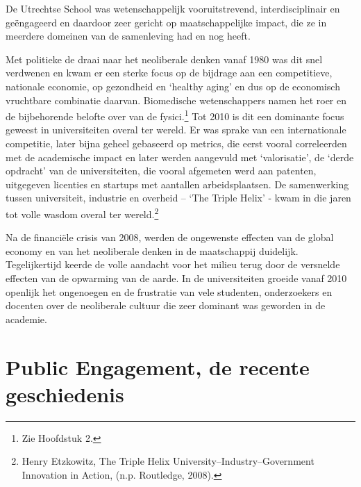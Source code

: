\documentclass[empirical, authordate, ]{new-jote-article}
\begin{document}
	 De Utrechtse School was wetenschappelijk vooruitstrevend, interdisciplinair en geëngageerd en daardoor zeer gericht op maatschappelijke impact, die ze in meerdere domeinen van de samenleving had en nog heeft.



	Met politieke de draai naar het neoliberale denken vanaf 1980 was dit snel verdwenen en kwam er een sterke focus op de bijdrage aan een competitieve, nationale economie, op gezondheid en ‘healthy aging' en dus op de economisch vruchtbare combinatie daarvan. Biomedische wetenschappers namen het roer en de bijbehorende belofte over van de fysici.\footnote{Zie Hoofdstuk 2. } Tot 2010 is dit een dominante focus geweest in universiteiten overal ter wereld. Er was sprake van een internationale competitie, later bijna geheel gebaseerd op metrics, die eerst vooral correleerden met de academische impact en later werden aangevuld met ‘valorisatie', de ‘derde opdracht' van de universiteiten, die vooral afgemeten werd aan patenten, uitgegeven licenties en startups met aantallen arbeidsplaatsen. De samenwerking tussen universiteit, industrie en overheid -- ‘The Triple Helix' - kwam in die jaren tot volle wasdom overal ter wereld.\footnote{Henry Etzkowitz, The Triple Helix University--Industry--Government Innovation in Action, (n.p. Routledge, 2008). }



	Na de financiële crisis van 2008, werden de ongewenste effecten van de global economy en van het neoliberale denken in de maatschappij duidelijk. Tegelijkertijd keerde de volle aandacht voor het milieu terug door de versnelde effecten van de opwarming van de aarde. In de universiteiten groeide vanaf 2010 openlijk het ongenoegen en de frustratie van vele studenten, onderzoekers en docenten over de neoliberale cultuur die zeer dominant was geworden in de academie.



	\section{Public Engagement, de recente geschiedenis}
\end{document}
